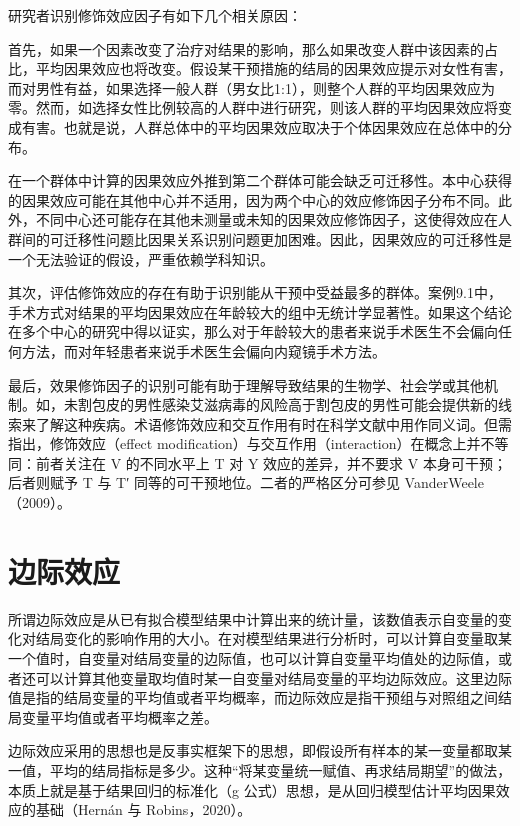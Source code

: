 \documentclass[
  chinese-hans,
  letterpaper,
  DIV=11,
  numbers=noendperiod]{scrreprt}
\begin{document}
研究者识别修饰效应因子有如下几个相关原因：

首先，如果一个因素改变了治疗对结果的影响，那么如果改变人群中该因素的占比，平均因果效应也将改变。假设某干预措施的结局的因果效应提示对女性有害，而对男性有益，如果选择一般人群（男女比1:1），则整个人群的平均因果效应为零。然而，如选择女性比例较高的人群中进行研究，则该人群的平均因果效应将变成有害。也就是说，人群总体中的平均因果效应取决于个体因果效应在总体中的分布。

在一个群体中计算的因果效应外推到第二个群体可能会缺乏可迁移性。本中心获得的因果效应可能在其他中心并不适用，因为两个中心的效应修饰因子分布不同。此外，不同中心还可能存在其他未测量或未知的因果效应修饰因子，这使得效应在人群间的可迁移性问题比因果关系识别问题更加困难。因此，因果效应的可迁移性是一个无法验证的假设，严重依赖学科知识。

其次，评估修饰效应的存在有助于识别能从干预中受益最多的群体。案例9.1中，手术方式对结果的平均因果效应在年龄较大的组中无统计学显著性。如果这个结论在多个中心的研究中得以证实，那么对于年龄较大的患者来说手术医生不会偏向任何方法，而对年轻患者来说手术医生会偏向内窥镜手术方法。

最后，效果修饰因子的识别可能有助于理解导致结果的生物学、社会学或其他机制。如，未割包皮的男性感染艾滋病毒的风险高于割包皮的男性可能会提供新的线索来了解这种疾病。术语修饰效应和交互作用有时在科学文献中用作同义词。但需指出，修饰效应（effect
modification）与交互作用（interaction）在概念上并不等同：前者关注在 V
的不同水平上 T 对 Y 效应的差异，并不要求 V 本身可干预；后者则赋予 T 与
T′ 同等的可干预地位。二者的严格区分可参见 VanderWeele（2009）。

\section{边际效应}\label{ux8fb9ux9645ux6548ux5e94}

所谓边际效应是从已有拟合模型结果中计算出来的统计量，该数值表示自变量的变化对结局变化的影响作用的大小。在对模型结果进行分析时，可以计算自变量取某一个值时，自变量对结局变量的边际值，也可以计算自变量平均值处的边际值，或者还可以计算其他变量取均值时某一自变量对结局变量的平均边际效应。这里边际值是指的结局变量的平均值或者平均概率，而边际效应是指干预组与对照组之间结局变量平均值或者平均概率之差。

边际效应采用的思想也是反事实框架下的思想，即假设所有样本的某一变量都取某一值，平均的结局指标是多少。这种``将某变量统一赋值、再求结局期望''的做法，本质上就是基于结果回归的标准化（g
公式）思想，是从回归模型估计平均因果效应的基础（Hernán 与
Robins，2020）。
\end{document}
